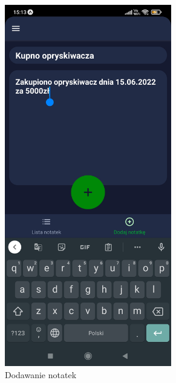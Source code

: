 \documentclass[a4paper,12pt,oneside]{book}
\begin{document}
	\begin{figure}[H]
		\centering
		\begin{subfigure}{.5\textwidth}
			\centering
			\includegraphics[width=0.8\textwidth]{grafika/notatki_a.jpg}
			\caption{Dodawanie notatek}
		\end{subfigure}%
		\begin{subfigure}{.5\textwidth}
			\centering

\end{subfigure}
\end{figure}
\end{document}
